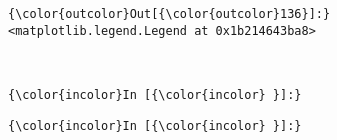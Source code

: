 \documentclass[11pt]{article}
\begin{document}
            \begin{Verbatim}[commandchars=\\\{\}]
{\color{outcolor}Out[{\color{outcolor}136}]:} <matplotlib.legend.Legend at 0x1b214643ba8>
\end{Verbatim}
        
    \begin{center}
    \end{center}
    { \hspace*{\fill} \\}
    
    \begin{Verbatim}[commandchars=\\\{\}]
{\color{incolor}In [{\color{incolor} }]:} 
\end{Verbatim}

    \begin{Verbatim}[commandchars=\\\{\}]
{\color{incolor}In [{\color{incolor} }]:} 
\end{Verbatim}


    
    
    
    
\end{document}
